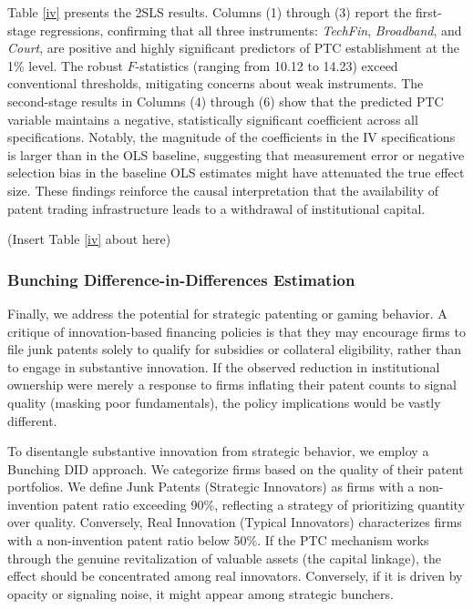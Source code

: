 \documentclass[12pt,a4paper]{article}
\begin{document}
Table \ref{iv} presents the 2SLS results. Columns (1) through (3) report the first-stage regressions, confirming that all three instruments: \textit{TechFin}, \textit{Broadband}, and \textit{Court}, are positive and highly significant predictors of PTC establishment at the 1\% level. The robust $F$-statistics (ranging from 10.12 to 14.23) exceed conventional thresholds, mitigating concerns about weak instruments. The second-stage results in Columns (4) through (6) show that the predicted PTC variable maintains a negative, statistically significant coefficient across all specifications. Notably, the magnitude of the coefficients in the IV specifications is larger than in the OLS baseline, suggesting that measurement error or negative selection bias in the baseline OLS estimates might have attenuated the true effect size. These findings reinforce the causal interpretation that the availability of patent trading infrastructure leads to a withdrawal of institutional capital.

\begin{center}
    (Insert Table \ref{iv} about here)
\end{center}

\subsubsection{Bunching Difference-in-Differences Estimation}
Finally, we address the potential for strategic patenting or gaming behavior. A critique of innovation-based financing policies is that they may encourage firms to file junk patents solely to qualify for subsidies or collateral eligibility, rather than to engage in substantive innovation. If the observed reduction in institutional ownership were merely a response to firms inflating their patent counts to signal quality (masking poor fundamentals), the policy implications would be vastly different.

To disentangle substantive innovation from strategic behavior, we employ a Bunching DID approach. We categorize firms based on the quality of their patent portfolios. We define Junk Patents (Strategic Innovators) as firms with a non-invention patent ratio exceeding 90\%, reflecting a strategy of prioritizing quantity over quality. Conversely, Real Innovation (Typical Innovators) characterizes firms with a non-invention patent ratio below 50\%. If the PTC mechanism works through the genuine revitalization of valuable assets (the capital linkage), the effect should be concentrated among real innovators. Conversely, if it is driven by opacity or signaling noise, it might appear among strategic bunchers.
\end{document}
